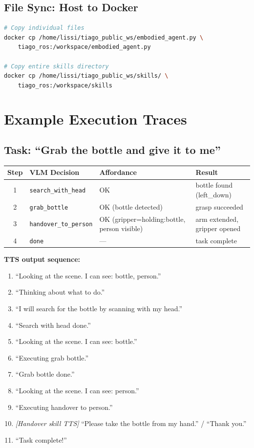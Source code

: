 \documentclass[12pt,a4paper]{report}
\begin{document}
\section{File Sync: Host to Docker}

\begin{lstlisting}[language=bash]
# Copy individual files
docker cp /home/lissi/tiago_public_ws/embodied_agent.py \
    tiago_ros:/workspace/embodied_agent.py

# Copy entire skills directory
docker cp /home/lissi/tiago_public_ws/skills/ \
    tiago_ros:/workspace/skills
\end{lstlisting}

\chapter{Example Execution Traces}

\section{Task: ``Grab the bottle and give it to me''}

\begin{center}
\begin{tabular}{clll}
\toprule
\textbf{Step} & \textbf{VLM Decision} & \textbf{Affordance} & \textbf{Result} \\
\midrule
1 & \texttt{search\_with\_head} & OK & bottle found (left\_down) \\
2 & \texttt{grab\_bottle}       & OK (bottle detected) & grasp succeeded \\
3 & \texttt{handover\_to\_person} & OK (gripper=holding:bottle, person visible) & arm extended, gripper opened \\
4 & \texttt{done}               & — & task complete \\
\bottomrule
\end{tabular}
\end{center}

\textbf{TTS output sequence:}
\begin{enumerate}[noitemsep]
  \item ``Looking at the scene. I can see: bottle, person.''
  \item ``Thinking about what to do.''
  \item ``I will search for the bottle by scanning with my head.''
  \item ``Search with head done.''
  \item ``Looking at the scene. I can see: bottle.''
  \item ``Executing grab bottle.''
  \item ``Grab bottle done.''
  \item ``Looking at the scene. I can see: person.''
  \item ``Executing handover to person.''
  \item \textit{[Handover skill TTS]} ``Please take the bottle from my hand.'' / ``Thank you.''
  \item ``Task complete!''
\end{enumerate}
\end{document}

